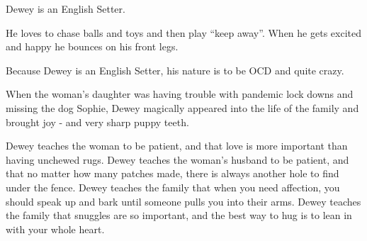 \documentclass[
  openany]{book}
\begin{document}
Dewey is an English Setter.

He loves to chase balls and toys and then play ``keep away''.
When he gets excited and happy he bounces on his front legs.

Because Dewey is an English Setter, his nature is to be OCD and quite crazy.

When the woman's daughter was having trouble with pandemic lock downs and missing the dog Sophie,
Dewey magically appeared into the life of the family and brought joy - and very sharp puppy teeth.

Dewey teaches the woman to be patient, and that love is more important than having unchewed rugs.
Dewey teaches the woman's husband to be patient, and that no matter how many patches made, there is always another hole to find under the fence.
Dewey teaches the family that when you need affection, you should speak up and bark until someone pulls you into their arms.
Dewey teaches the family that snuggles are so important, and the best way to hug is to lean in with your whole heart.
\end{document}
